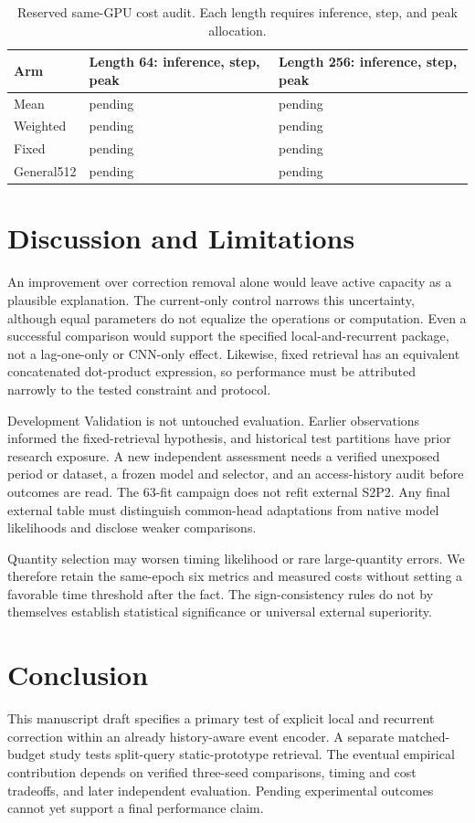 \documentclass[runningheads]{llncs}
\begin{document}
\begin{table}[t]
\caption{Reserved same-GPU cost audit. Each
length requires inference, step, and peak allocation.}
\label{tab:cost}
\centering\small
\begin{tabular}{@{}p{}p{}p{}@{}}
\toprule
Arm & Length 64: inference, step, peak &
Length 256: inference, step, peak\\
\midrule
Mean & pending & pending\\
Weighted & pending & pending\\
Fixed & pending & pending\\
General512 & pending & pending\\
\bottomrule
\end{tabular}
\end{table}

\section{Discussion and Limitations}
An improvement over correction removal alone
would leave active capacity as a plausible
explanation. The current-only control narrows
this uncertainty, although equal parameters
do not equalize the operations or computation.
Even a successful comparison would support
the specified local-and-recurrent package,
not a lag-one-only or CNN-only effect.
Likewise, fixed retrieval has an equivalent
concatenated dot-product expression, so
performance must be attributed narrowly
to the tested constraint and protocol.

Development Validation is not untouched
evaluation. Earlier observations informed
the fixed-retrieval hypothesis, and historical
test partitions have prior research exposure.
A new independent assessment needs a verified
unexposed period or dataset, a frozen model
and selector, and an access-history audit
before outcomes are read. The 63-fit
campaign does not refit external S2P2.
Any final external table must distinguish
common-head adaptations from native model
likelihoods and disclose weaker comparisons.

Quantity selection may worsen timing
likelihood or rare large-quantity errors.
We therefore retain the same-epoch six
metrics and measured costs without setting
a favorable time threshold after the fact.
The sign-consistency rules do not by
themselves establish statistical significance
or universal external superiority.

\section{Conclusion}
This manuscript draft specifies a primary
test of explicit local and recurrent
correction within an already history-aware
event encoder. A separate matched-budget
study tests split-query static-prototype
retrieval. The eventual empirical
contribution depends on verified
three-seed comparisons, timing and cost
tradeoffs, and later independent
evaluation. Pending experimental outcomes
cannot yet support a final performance
claim.
\end{document}
